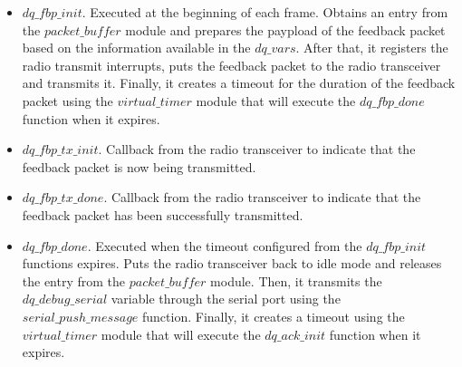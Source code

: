 \begin{itemize}
\item $dq\_fbp\_init$. Executed at the beginning of each frame. Obtains an entry from the $packet\_buffer$ module and prepares the paypload of the feedback packet based on the information available in the $dq\_vars$. After that, it registers the radio transmit interrupts, puts the feedback packet to the radio transceiver and transmits it. Finally, it creates a timeout for the duration of the feedback packet using the $virtual\_timer$ module that will execute the $dq\_fbp\_done$ function when it expires.
\item $dq\_fbp\_tx\_init$. Callback from the radio transceiver to indicate that the feedback packet is now being transmitted.
\item $dq\_fbp\_tx\_done$. Callback from the radio transceiver to indicate that the feedback packet has been successfully transmitted.
\item $dq\_fbp\_done$. Executed when the timeout configured from the $dq\_fbp\_init$ functions expires. Puts the radio transceiver back to idle mode and releases the entry from the $packet\_buffer$ module. Then, it transmits the $dq\_debug\_serial$ variable through the serial port using the $serial\_push\_message$ function. Finally, it creates a timeout using the $virtual\_timer$ module that will execute the $dq\_ack\_init$ function when it expires.


\end{itemize}
